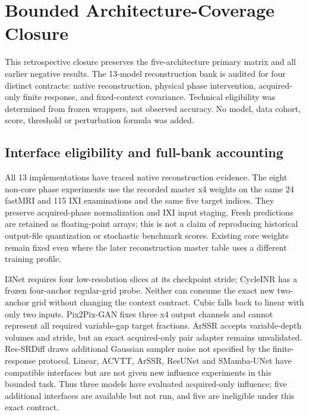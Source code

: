 \section{Bounded Architecture-Coverage Closure}

\label{sec:architecture-closure}

This retrospective closure preserves the five-architecture primary matrix and all earlier negative results. The 13-model reconstruction bank is audited for four distinct contracts: native reconstruction, physical phase intervention, acquired-only finite response, and fixed-context covariance. Technical eligibility was determined from frozen wrappers, not observed accuracy. No model, data cohort, score, threshold or perturbation formula was added.

\subsection{Interface eligibility and full-bank accounting}

All 13 implementations have traced native reconstruction evidence. The eight non-core phase experiments use the recorded master x4 weights on the same 24 fastMRI and 115 IXI examinations and the same five target indices. They preserve acquired-phase normalization and IXI input staging. Fresh predictions are retained as floating-point arrays; this is not a claim of reproducing historical output-file quantization or stochastic benchmark scores. Existing core weights remain fixed even where the later reconstruction master table uses a different training profile.

I3Net requires four low-resolution slices at its checkpoint stride; CycleINR has a frozen four-anchor regular-grid probe. Neither can consume the exact new two-anchor grid without changing the context contract. Cubic falls back to linear with only two inputs. Pix2Pix-GAN fixes three x4 output channels and cannot represent all required variable-gap target fractions. ArSSR accepts variable-depth volumes and stride, but an exact acquired-only pair adapter remains unvalidated. Res-SRDiff draws additional Gaussian sampler noise not specified by the finite-response protocol. Linear, ACVTT, ArSSR, ResUNet and SMamba-UNet have compatible interfaces but are not given new influence experiments in this bounded task. Thus three models have evaluated acquired-only influence; five additional interfaces are available but not run, and five are ineligible under this exact contract.


